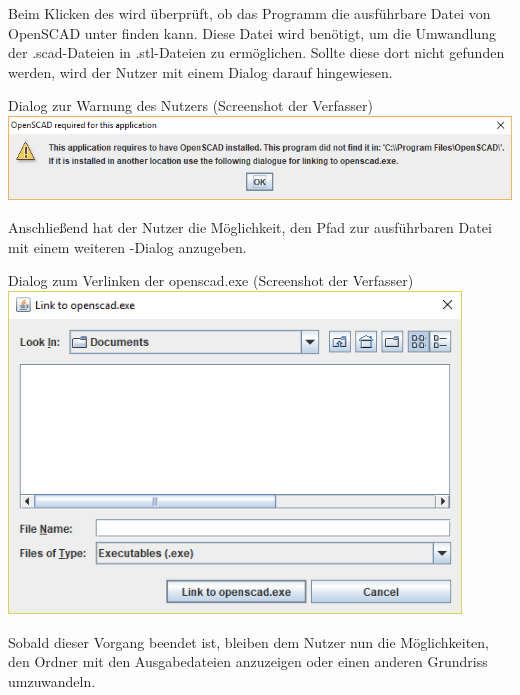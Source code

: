 Beim Klicken des  wird überprüft, ob das Programm die ausführbare Datei von OpenSCAD unter  finden kann.
Diese Datei wird benötigt, um die Umwandlung der .scad-Dateien in .stl-Dateien zu ermöglichen.
Sollte diese dort nicht gefunden werden, wird der Nutzer mit einem Dialog darauf hingewiesen.

\begin{Bild}{Dialog zur Warnung des Nutzers (Screenshot der Verfasser)}
	\includegraphics[width = \textwidth]{Bilder/GUI/GUI_SCAD_Error}
\end{Bild}

Anschließend hat der Nutzer die Möglichkeit, den Pfad zur ausführbaren Datei mit einem weiteren -Dialog anzugeben.

\begin{Bild}{Dialog zum Verlinken der openscad.exe (Screenshot der Verfasser)}
	\includegraphics[width = 120mm]{Bilder/GUI/GUI_SCAD_Linking}
\end{Bild}

Sobald dieser Vorgang beendet ist, bleiben dem Nutzer nun die Möglichkeiten, den Ordner mit den Ausgabedateien anzuzeigen oder einen anderen Grundriss umzuwandeln.\\